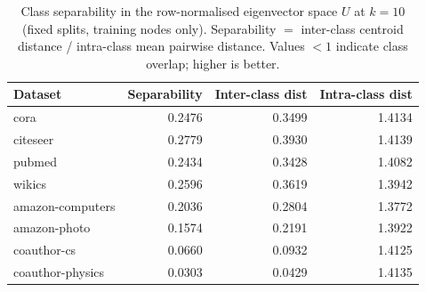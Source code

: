 \begin{table}[t]
\centering\small\setlength{\tabcolsep}{6pt}
\caption{Class separability in the row-normalised eigenvector space $U$ at $k=10$ (fixed splits, training nodes only). Separability $=$ inter-class centroid distance / intra-class mean pairwise distance. Values $<1$ indicate class overlap; higher is better.}
\label{tab:separability}
\begin{tabular}{lrrr}
\toprule
Dataset & Separability & Inter-class dist & Intra-class dist \\
\midrule
cora & 0.2476 & 0.3499 & 1.4134 \\
citeseer & 0.2779 & 0.3930 & 1.4139 \\
pubmed & 0.2434 & 0.3428 & 1.4082 \\
wikics & 0.2596 & 0.3619 & 1.3942 \\
amazon\mbox{-}computers & 0.2036 & 0.2804 & 1.3772 \\
amazon\mbox{-}photo & 0.1574 & 0.2191 & 1.3922 \\
coauthor\mbox{-}cs & 0.0660 & 0.0932 & 1.4125 \\
coauthor\mbox{-}physics & 0.0303 & 0.0429 & 1.4135 \\
\bottomrule\end{tabular}\end{table}